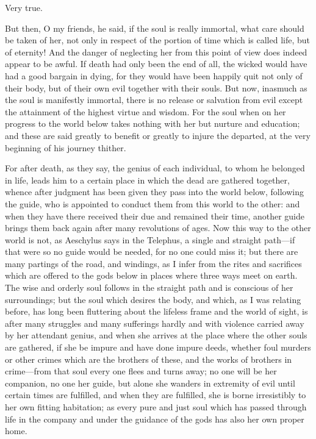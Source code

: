 \documentclass[11pt,letter]{article}
\begin{document}
\par  Very true.

\par  But then, O my friends, he said, if the soul is really immortal, what care should be taken of her, not only in respect of the portion of time which is called life, but of eternity! And the danger of neglecting her from this point of view does indeed appear to be awful. If death had only been the end of all, the wicked would have had a good bargain in dying, for they would have been happily quit not only of their body, but of their own evil together with their souls. But now, inasmuch as the soul is manifestly immortal, there is no release or salvation from evil except the attainment of the highest virtue and wisdom. For the soul when on her progress to the world below takes nothing with her but nurture and education; and these are said greatly to benefit or greatly to injure the departed, at the very beginning of his journey thither.

\par  For after death, as they say, the genius of each individual, to whom he belonged in life, leads him to a certain place in which the dead are gathered together, whence after judgment has been given they pass into the world below, following the guide, who is appointed to conduct them from this world to the other: and when they have there received their due and remained their time, another guide brings them back again after many revolutions of ages. Now this way to the other world is not, as Aeschylus says in the Telephus, a single and straight path—if that were so no guide would be needed, for no one could miss it; but there are many partings of the road, and windings, as I infer from the rites and sacrifices which are offered to the gods below in places where three ways meet on earth. The wise and orderly soul follows in the straight path and is conscious of her surroundings; but the soul which desires the body, and which, as I was relating before, has long been fluttering about the lifeless frame and the world of sight, is after many struggles and many sufferings hardly and with violence carried away by her attendant genius, and when she arrives at the place where the other souls are gathered, if she be impure and have done impure deeds, whether foul murders or other crimes which are the brothers of these, and the works of brothers in crime—from that soul every one flees and turns away; no one will be her companion, no one her guide, but alone she wanders in extremity of evil until certain times are fulfilled, and when they are fulfilled, she is borne irresistibly to her own fitting habitation; as every pure and just soul which has passed through life in the company and under the guidance of the gods has also her own proper home.
\end{document}
